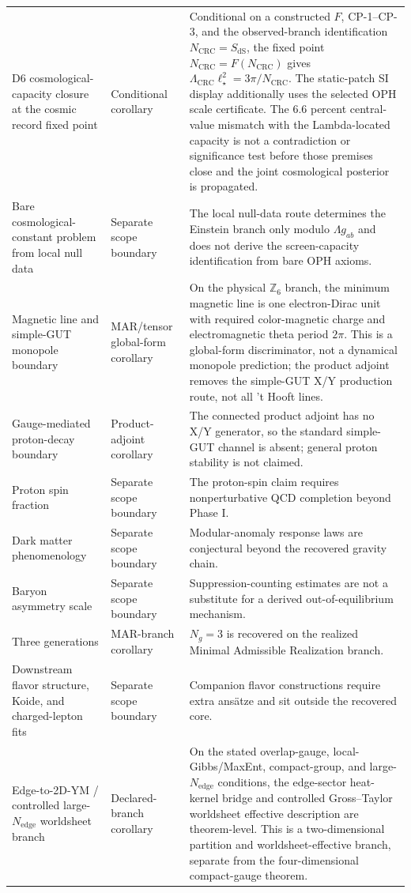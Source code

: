 \begin{center}
\begin{tabular}{@{}>{\raggedright\arraybackslash}p{}>{\raggedright\arraybackslash}p{}>{\raggedright\arraybackslash}p{}@{}}
D6 cosmological-capacity closure at the cosmic record fixed point & Conditional corollary & Conditional on a constructed \(F\), CP-1--CP-3, and the observed-branch identification \(N_{\mathrm{CRC}}=S_{\mathrm{dS}}\), the fixed point \(N_{\mathrm{CRC}}=F(N_{\mathrm{CRC}})\) gives \(\Lambda_{\mathrm{CRC}}\ell_\star^2=3\pi/N_{\mathrm{CRC}}\). The static-patch SI display additionally uses the selected OPH scale certificate. The 6.6 percent central-value mismatch with the Lambda-located capacity is not a contradiction or significance test before those premises close and the joint cosmological posterior is propagated. \\
Bare cosmological-constant problem from local null data & Separate scope boundary & The local null-data route determines the Einstein branch only modulo \(\Lambda g_{ab}\) and does not derive the screen-capacity identification from bare OPH axioms. \\
Magnetic line and simple-GUT monopole boundary & MAR/tensor global-form corollary & On the physical \(\mathbb Z_6\) branch, the minimum magnetic line is one electron-Dirac unit with required color-magnetic charge and electromagnetic theta period \(2\pi\). This is a global-form discriminator, not a dynamical monopole prediction; the product adjoint removes the simple-GUT X/Y production route, not all 't Hooft lines. \\
Gauge-mediated proton-decay boundary & Product-adjoint corollary & The connected product adjoint has no X/Y generator, so the standard simple-GUT channel is absent; general proton stability is not claimed. \\
Proton spin fraction & Separate scope boundary & The proton-spin claim requires nonperturbative QCD completion beyond Phase I. \\
Dark matter phenomenology & Separate scope boundary & Modular-anomaly response laws are conjectural beyond the recovered gravity chain. \\
Baryon asymmetry scale & Separate scope boundary & Suppression-counting estimates are not a substitute for a derived out-of-equilibrium mechanism. \\
Three generations & MAR-branch corollary & \(N_g=3\) is recovered on the realized Minimal Admissible Realization branch. \\
Downstream flavor structure, Koide, and charged-lepton fits & Separate scope boundary & Companion flavor constructions require extra ans\"atze and sit outside the recovered core. \\
Edge-to-2D-YM / controlled large-\(N_{\mathrm{edge}}\) worldsheet branch & Declared-branch corollary & On the stated overlap-gauge, local-Gibbs/MaxEnt, compact-group, and large-\(N_{\mathrm{edge}}\) conditions, the edge-sector heat-kernel bridge and controlled Gross--Taylor worldsheet effective description are theorem-level. This is a two-dimensional partition and worldsheet-effective branch, separate from the four-dimensional compact-gauge theorem. \\

\end{tabular}
\end{center}
